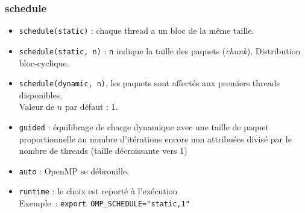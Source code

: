 \documentclass{beamer}
\begin{document}
\begin{frame}
  \frametitle{schedule}

  \begin{itemize}
  \item {\tt schedule(static)} : chaque thread a un bloc de la même taille.
    
  \item {\tt schedule(static, n)} : {\tt n} indique la taille des
    paquets ({\it chunk}). Distribution bloc-cyclique.   


  \item {\tt schedule(dynamic, n)},
  les paquets sont affectés aux premiers threads disponibles.\\
  Valeur de $n$ par défaut : $1$.


  \item {\tt guided} : équilibrage de charge dynamique avec une taille de
  paquet proportionnelle au nombre d'itérations encore non attribuées
  divisé par le nombre de threads (taille décroissante vers 1)


\item {\tt auto} : OpenMP se débrouille.
  
  \item {\tt runtime} : le choix est
  reporté à l'exécution \\
    Exemple~: {\tt export OMP\_SCHEDULE="static,1"}
  \end{itemize}
\end{frame}




   
\end{document}
